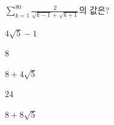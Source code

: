 \hspace*{2mm}\begin{minipage}[t]{\dimexpr\linewidth-2mm\relax}\vspace{0pt}
$\displaystyle\sum_{k=1}^{80}\frac{2}{\sqrt{k-1}+\sqrt{k+1}}$의 값은?
\begin{choices32}{\rule[-3ex]{0pt}{8ex}$4\sqrt{5}-1$}{\rule[-3ex]{0pt}{8ex}$8$}{\rule[-3ex]{0pt}{8ex}$8+4\sqrt{5}$}{\rule[-3ex]{0pt}{8ex}$24$}{\rule[-3ex]{0pt}{8ex}$8+8\sqrt{5}$}\end{choices32}\end{minipage}
